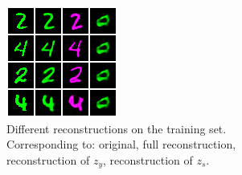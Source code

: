 \begin{figure}[tb]
  \centering
  \begin{subfigure}[b]{0.39\textwidth}
    \centering
    \includegraphics[width=\textwidth]{paper3/example_images/fresh-dawn-2179_train_reconstructions_9900.png}
    \caption{
    Different reconstructions on the training set.
    Corresponding to: original, full reconstruction, reconstruction of $z_y$, reconstruction of $z_s$.
    }%
    \label{fig:cmnist-recon-training}
  \end{subfigure}
  \quad
  \begin{subfigure}[b]{0.39\textwidth}
    \centering

\end{subfigure}
\end{figure}
